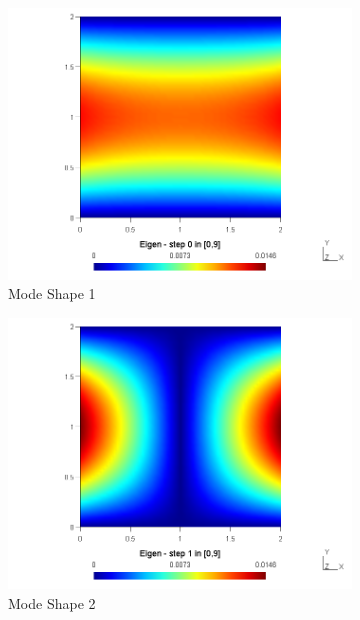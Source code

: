 \documentclass[main.tex]{subfiles}
\begin{document}
\begin{figure}[h!]
\begin{subfigure}{.49\textwidth}
\includegraphics[width=\linewidth,trim={4cm 0 4cm 0},clip]{images/VMP09/1.png}
\caption{Mode Shape 1}
\end{subfigure} \hfill
\begin{subfigure}{.49\textwidth}
\includegraphics[width=\linewidth,trim={4cm 0 4cm 0},clip]{images/VMP09/2.png}
\caption{Mode Shape 2}
\end{subfigure}\vfill
\begin{subfigure}{.49\textwidth}

\end{subfigure}
\end{figure}
\end{document}

